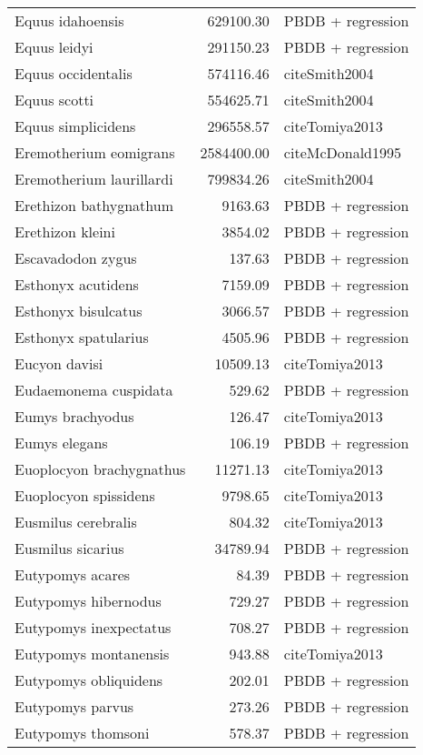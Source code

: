 \begin{table}[ht]
\begin{tabular}{lrl}
  Equus idahoensis & 629100.30 & PBDB + regression \\ 
  Equus leidyi & 291150.23 & PBDB + regression \\ 
  Equus occidentalis & 574116.46 & cite{Smith2004} \\ 
  Equus scotti & 554625.71 & cite{Smith2004} \\ 
  Equus simplicidens & 296558.57 & cite{Tomiya2013} \\ 
  Eremotherium eomigrans & 2584400.00 & cite{McDonald1995} \\ 
  Eremotherium laurillardi & 799834.26 & cite{Smith2004} \\ 
  Erethizon bathygnathum & 9163.63 & PBDB + regression \\ 
  Erethizon kleini & 3854.02 & PBDB + regression \\ 
  Escavadodon zygus & 137.63 & PBDB + regression \\ 
  Esthonyx acutidens & 7159.09 & PBDB + regression \\ 
  Esthonyx bisulcatus & 3066.57 & PBDB + regression \\ 
  Esthonyx spatularius & 4505.96 & PBDB + regression \\ 
  Eucyon davisi & 10509.13 & cite{Tomiya2013} \\ 
  Eudaemonema cuspidata & 529.62 & PBDB + regression \\ 
  Eumys brachyodus & 126.47 & cite{Tomiya2013} \\ 
  Eumys elegans & 106.19 & PBDB + regression \\ 
  Euoplocyon brachygnathus & 11271.13 & cite{Tomiya2013} \\ 
  Euoplocyon spissidens & 9798.65 & cite{Tomiya2013} \\ 
  Eusmilus cerebralis & 804.32 & cite{Tomiya2013} \\ 
  Eusmilus sicarius & 34789.94 & PBDB + regression \\ 
  Eutypomys acares & 84.39 & PBDB + regression \\ 
  Eutypomys hibernodus & 729.27 & PBDB + regression \\ 
  Eutypomys inexpectatus & 708.27 & PBDB + regression \\ 
  Eutypomys montanensis & 943.88 & cite{Tomiya2013} \\ 
  Eutypomys obliquidens & 202.01 & PBDB + regression \\ 
  Eutypomys parvus & 273.26 & PBDB + regression \\ 
  Eutypomys thomsoni & 578.37 & PBDB + regression \\ 

\end{tabular}
\end{table}
